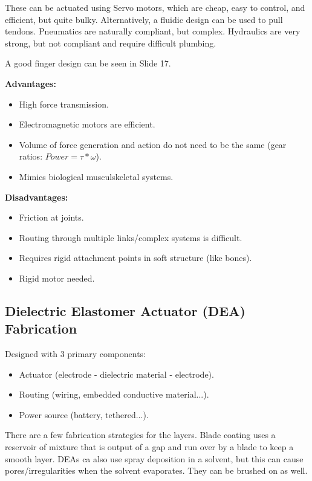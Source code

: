 \documentclass[onecolumn,a4paper]{article}
\begin{document}
These can be actuated using Servo motors, which are cheap, easy to control, and efficient, but quite bulky. Alternatively, a fluidic design can be used to pull tendons. Pneumatics are naturally compliant, but complex. Hydraulics are very strong, but not compliant and require difficult plumbing.

A good finger design can be seen in Slide 17.

\textbf{Advantages:}
\begin{itemize}
    \item High force transmission.
    \item Electromagnetic motors are efficient.
    \item Volume of force generation and action do not need to be the same (gear ratios: $Power = \tau * \omega$).
    \item Mimics biological musculskeletal systems.
\end{itemize}
\textbf{Disadvantages:}
\begin{itemize}
    \item Friction at joints.
    \item Routing through multiple links/complex systems is difficult.
    \item Requires rigid attachment points in soft structure (like bones).
    \item Rigid motor needed.
\end{itemize}

\subsection{Dielectric Elastomer Actuator (DEA) Fabrication}

Designed with 3 primary components:
\begin{itemize}
    \item Actuator (electrode - dielectric material - electrode).
    \item Routing (wiring, embedded conductive material...).
    \item Power source (battery, tethered...).
\end{itemize}

There are a few fabrication strategies for the layers. Blade coating uses a reservoir of mixture that is output of a gap and run over by a blade to keep a smooth layer. DEAs ca also use spray deposition in a solvent, but this can cause pores/irregularities when the solvent evaporates. They can be brushed on as well.
\end{document}
